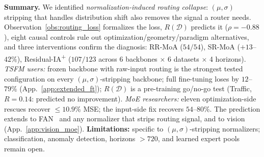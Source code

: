 \documentclass{article}
\begin{document}
{ \textbf{Summary.} We identified \emph{normalization-induced routing collapse}: $(\mu,\sigma)$ stripping that handles distribution shift also removes the signal a router needs. Observation~\ref{obs:routing_loss} formalizes the loss, $R(\mathcal{D})$ predicts it ($\rho{=}{-}0.88$), eight causal controls rule out optimization/geometry/paradigm alternatives, and three interventions confirm the diagnosis: RR-MoA ($54/54$), SR-MoA ($+13$--$42\%$), Residual-IA\textsuperscript{+} ($107/123$ across 6 backbones $\times$ 6 datasets $\times$ 4 horizons). \emph{TSFM users:} frozen backbone with raw-input routing is the strongest tested configuration on every $(\mu,\sigma)$-stripping backbone; full fine-tuning loses by $12$--$79\%$ (App.~\ref{app:extended_ft}); $R(\mathcal{D})$ is a pre-training go/no-go test (Traffic, $R{=}0.14$: predicted no improvement). \emph{MoE researchers:} eleven optimization-side rescues recover ${\leq}10.9\%$ MSE; the input-side fix recovers $54$--$80\%$. The prediction extends to FAN~\citep{ye2024fan} and any normalizer that strips routing signal, and to vision (App.~\ref{app:vision_moe}). \textbf{Limitations:} specific to $(\mu,\sigma)$-stripping normalizers; classification, anomaly detection, horizons ${>}720$, and learned expert pools remain open.\label{page:end_main}}

\end{document}
